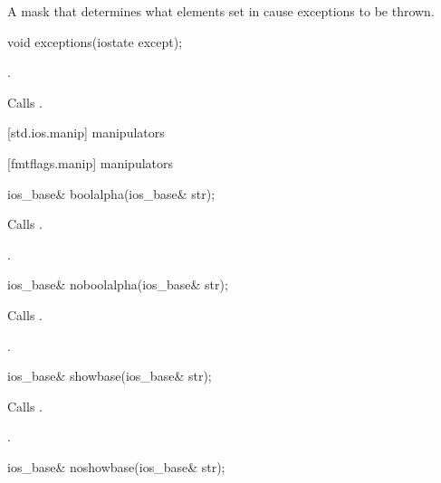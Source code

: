 \begin{itemdescr}
\pnum
\returns
A mask that determines what elements set in
cause exceptions to be thrown.
\end{itemdescr}

%
%
\begin{itemdecl}
void exceptions(iostate except);
\end{itemdecl}

\begin{itemdescr}
\pnum
\postcondition
{}.

\pnum
\effects
Calls
.
\end{itemdescr}

[std.ios.manip]{ manipulators}

[fmtflags.manip]{ manipulators}

%
\begin{itemdecl}
ios_base& boolalpha(ios_base& str);
\end{itemdecl}

\begin{itemdescr}
\pnum
\effects
Calls
.

\pnum
\returns
{}.
\end{itemdescr}

%
\begin{itemdecl}
ios_base& noboolalpha(ios_base& str);
\end{itemdecl}

\begin{itemdescr}
\pnum
\effects
Calls
.

\pnum
\returns
{}.
\end{itemdescr}

%
\begin{itemdecl}
ios_base& showbase(ios_base& str);
\end{itemdecl}

\begin{itemdescr}
\pnum
\effects
Calls
.

\pnum
\returns
{}.
\end{itemdescr}

%
\begin{itemdecl}
ios_base& noshowbase(ios_base& str);
\end{itemdecl}

